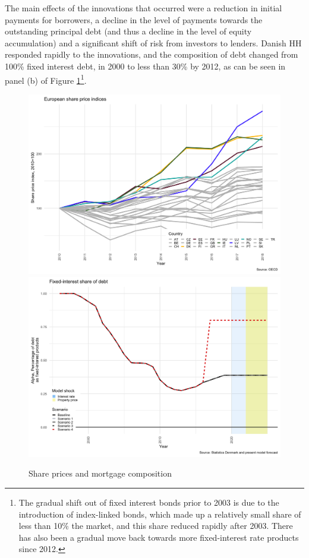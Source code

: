 \documentclass[
]{book}
\begin{document}
The main effects of the innovations that occurred were a reduction in initial payments for borrowers, a decline in the level of payments towards the outstanding principal debt (and thus a decline in the level of equity accumulation) and a significant shift of risk from investors to lenders. Danish HH responded rapidly to the innovations, and the composition of debt changed from 100\% fixed interest debt, in 2000 to less than 30\% by 2012, as can be seen in panel (b) of Figure \ref{fig:fl-fi-sfc-plot-dk-equity-int}\footnote{The gradual shift out of fixed interest bonds prior to 2003 is due to the introduction of index-linked bonds, which made up a relatively small share of less than 10\% the market, and this share reduced rapidly after 2003. There has also been a gradual move back towards more fixed-interest rate products since 2012.}.

\begin{figure}[H]
\includegraphics[width=0.95\linewidth]{figures/fl-fi-sfc-plot-dk-equity-int-1} \includegraphics[width=0.95\linewidth]{figures/fl-fi-sfc-plot-dk-equity-int-2} \caption{Share prices and mortgage composition}\label{fig:fl-fi-sfc-plot-dk-equity-int}
\end{figure}
\end{document}
